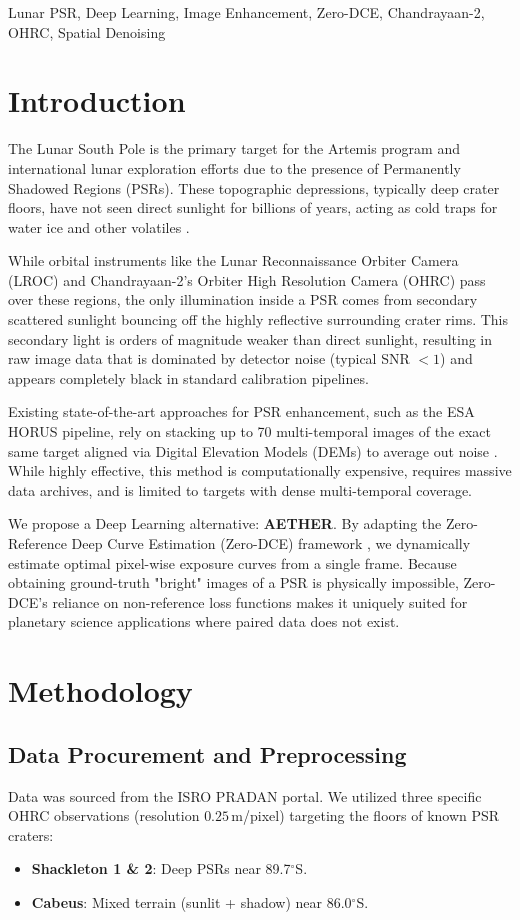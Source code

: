 \documentclass[conference]{IEEEtran}
\begin{document}
\begin{IEEEkeywords}
Lunar PSR, Deep Learning, Image Enhancement, Zero-DCE, Chandrayaan-2, OHRC, Spatial Denoising
\end{IEEEkeywords}

\section{Introduction}
The Lunar South Pole is the primary target for the Artemis program and international lunar exploration efforts due to the presence of Permanently Shadowed Regions (PSRs). These topographic depressions, typically deep crater floors, have not seen direct sunlight for billions of years, acting as cold traps for water ice and other volatiles \cite{horus2021}. 

While orbital instruments like the Lunar Reconnaissance Orbiter Camera (LROC) and Chandrayaan-2's Orbiter High Resolution Camera (OHRC) pass over these regions, the only illumination inside a PSR comes from secondary scattered sunlight bouncing off the highly reflective surrounding crater rims. This secondary light is orders of magnitude weaker than direct sunlight, resulting in raw image data that is dominated by detector noise (typical SNR $< 1$) and appears completely black in standard calibration pipelines.

Existing state-of-the-art approaches for PSR enhancement, such as the ESA HORUS pipeline, rely on stacking up to 70 multi-temporal images of the exact same target aligned via Digital Elevation Models (DEMs) to average out noise \cite{horus2021}. While highly effective, this method is computationally expensive, requires massive data archives, and is limited to targets with dense multi-temporal coverage.

We propose a Deep Learning alternative: \textbf{AETHER}. By adapting the Zero-Reference Deep Curve Estimation (Zero-DCE) framework \cite{guo2020zero}, we dynamically estimate optimal pixel-wise exposure curves from a single frame. Because obtaining ground-truth "bright" images of a PSR is physically impossible, Zero-DCE's reliance on non-reference loss functions makes it uniquely suited for planetary science applications where paired data does not exist. 

\section{Methodology}

\subsection{Data Procurement and Preprocessing}
Data was sourced from the ISRO PRADAN portal. We utilized three specific OHRC observations (resolution $0.25$\,m/pixel) targeting the floors of known PSR craters:
\begin{itemize}
    \item \textbf{Shackleton 1 \& 2}: Deep PSRs near 89.7$^{\circ}$S.
    \item \textbf{Cabeus}: Mixed terrain (sunlit + shadow) near 86.0$^{\circ}$S.
\end{itemize}
\end{document}
